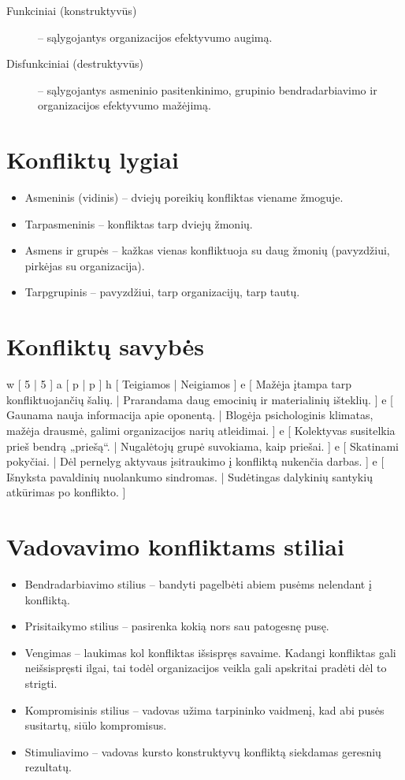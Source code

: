 \begin{description}
  \item[Funkciniai (konstruktyvūs)] – sąlygojantys organizacijos efektyvumo
    augimą.
  \item[Disfunkciniai (destruktyvūs)] – sąlygojantys asmeninio
    pasitenkinimo, grupinio bendradarbiavimo ir organizacijos efektyvumo
    mažėjimą.
\end{description}

\section{Konfliktų lygiai}

\begin{itemize}
  \item Asmeninis (vidinis) – dviejų poreikių konfliktas viename žmoguje.
  \item Tarpasmeninis – konfliktas tarp dviejų žmonių.
  \item Asmens ir grupės – kažkas vienas konfliktuoja su daug žmonių
    (pavyzdžiui, pirkėjas su organizacija).
  \item Tarpgrupinis – pavyzdžiui, tarp organizacijų, tarp tautų.
\end{itemize}

\section{Konfliktų savybės}

\xtable
{
  w [ 5 | 5 ]
  a [ p | p ]
  h [ Teigiamos | Neigiamos ]
  e [ Mažėja įtampa tarp konfliktuojančių šalių.
    | Prarandama daug emocinių ir materialinių išteklių. ]
  e [ Gaunama nauja informacija apie oponentą.
    | Blogėja psichologinis klimatas, mažėja drausmė, galimi
      organizacijos narių atleidimai. ]
  e [ Kolektyvas susitelkia prieš bendrą „priešą“.
    | Nugalėtojų grupė suvokiama, kaip priešai. ]
  e [ Skatinami pokyčiai.
    | Dėl pernelyg aktyvaus įsitraukimo į konfliktą nukenčia darbas. ]
  e [ Išnyksta pavaldinių nuolankumo sindromas.
    | Sudėtingas dalykinių santykių atkūrimas po konflikto. ]
}

\section{Vadovavimo konfliktams stiliai}

\begin{itemize}
  \item Bendradarbiavimo stilius – bandyti pagelbėti abiem pusėms
    nelendant į konfliktą.
  \item Prisitaikymo stilius – pasirenka kokią nors sau patogesnę
    pusę.
  \item Vengimas – laukimas kol konfliktas išsispręs savaime. Kadangi
    konfliktas gali neišsispręsti ilgai, tai todėl organizacijos veikla
    gali apskritai pradėti dėl to strigti.
  \item Kompromisinis stilius – vadovas užima tarpininko vaidmenį, kad
    abi pusės susitartų, siūlo kompromisus.
  \item Stimuliavimo – vadovas kursto konstruktyvų konfliktą siekdamas
    geresnių rezultatų.
\end{itemize}

